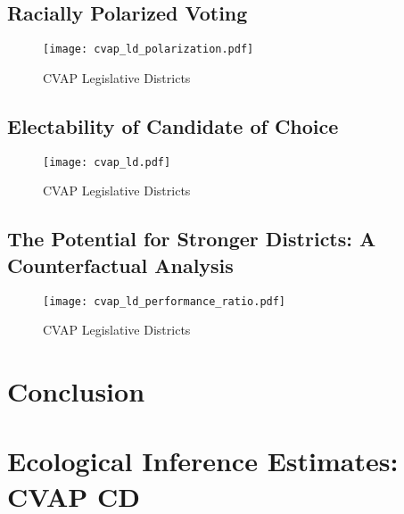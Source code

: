 \documentclass[12pt]{scrartcl}
\begin{document}
\subsection{Racially Polarized Voting}

\begin{figure}[ht]
\begin{centering}
\texttt{[image: cvap\_ld\_polarization.pdf]}
\caption{CVAP Legislative Districts}
\end{centering}
\end{figure}

\subsection{Electability of Candidate of Choice}

\begin{figure}[ht]
\begin{centering}
\texttt{[image: cvap\_ld.pdf]}
\caption{CVAP Legislative Districts}
\end{centering}
\end{figure}

\subsection{The Potential for Stronger Districts: A Counterfactual Analysis}

\begin{figure}[ht]
\begin{centering}
\texttt{[image: cvap\_ld\_performance\_ratio.pdf]}
\caption{CVAP Legislative Districts}
\end{centering}
\end{figure}

\section{Conclusion}

\singlespacing

\newpage




\appendix
\renewcommand*\appendixpagename{\section*{Appendix}}
\appendixpage

\section{Ecological Inference Estimates: CVAP CD}
\end{document}
